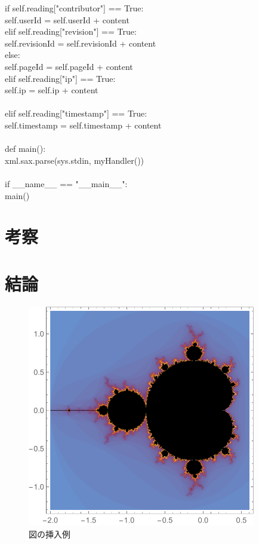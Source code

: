       if self.reading["contributor"] == True: \\
        self.userId = self.userId + content \\
      elif self.reading["revision"] == True: \\
        self.revisionId = self.revisionId + content \\
      else: \\
        self.pageId = self.pageId + content \\
    elif self.reading["ip"] == True: \\
        self.ip = self.ip + content \\
\\        
    elif self.reading["timestamp"] == True: \\
    	self.timestamp = self.timestamp + content \\
        \\
def main(): \\
  xml.sax.parse(sys.stdin, myHandler()) \\
 \\
if \_\_name\_\_ == "\_\_main\_\_": \\
  main() \\







\chapter{考察}

\chapter{結論}

\begin{figure}[htb]
\centering
\includegraphics[width=10cm]{figure.pdf}
\caption{図の挿入例}\label{サンプル図}
\end{figure}


